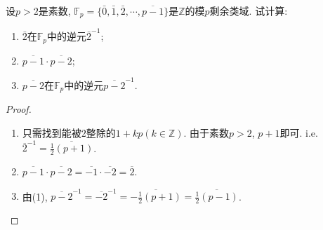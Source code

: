 \begin{problem}
    设$p > 2$是素数, $\mathbb{F}_p = \{\bar{0}, \bar{1}, \bar{2}, \cdots, \overline{p-1}\}$是$\mathbb{Z}$的模$p$剩余类域. 试计算:
    \begin{enumerate}[(1)]
        \item $\bar{2}$在$\mathbb{F}_p$中的逆元$\bar{2}^{-1}$;
        \item $\overline{p - 1} \cdot \overline{p - 2}$;
        \item $\overline{p - 2}$在$\mathbb{F}_p$中的逆元$\overline{p-2}^{-1}$.
    \end{enumerate}
\end{problem}

\begin{proof}
    \begin{enumerate}[(1)]
        \item 只需找到能被$2$整除的$1 + kp(k \in \mathbb{Z})$. 由于素数$p > 2$, $p + 1$即可. i.e. $\overline{2}^{-1} = \overline{\frac12(p + 1)}$.
        \item $\overline{p - 1} \cdot \overline{p - 2} = \overline{-1} \cdot \overline{-2} = \overline{2}$.
        \item 由(1), $\overline{p - 2}^{-1} = \overline{-2}^{-1} = \overline{-\frac12(p + 1)} = \overline{\frac12(p - 1)}$.
    \end{enumerate}
\end{proof}
    